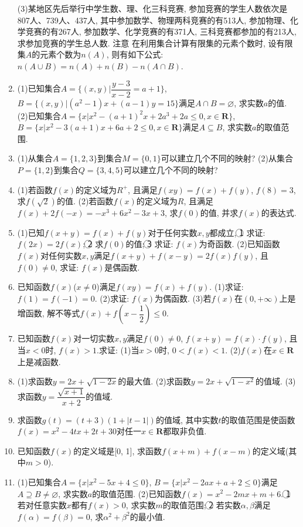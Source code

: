 \documentclass[10pt,a4paper]{article}
\begin{document}
\begin{enumerate}[1.]
(3)某地区先后举行中学生数、理、化三科竞赛, 参加竞赛的学生人数依次是807人、739人、437人, 其中参加数学、物理两科竞赛的有513人, 参加物理、化学竞赛的有267人, 参加数学、化学竞赛的有371人, 三科竞赛都参加的有213人, 求参加竞赛的学生总人数.
注意  在利用集合计算有限集的元素个数时, 设有限集$A$的元素个数为$n(A)$, 则有如下公式: $n(A\cup B)=n(A)+n(B)-n(A\cap B)$.
\item (1)已知集合$A=\{(x,y)|\dfrac{y-3}{x-2}=a+1\}$, $B=\{(x,y)|(a^2-1)x+(a-1)y=15\}$满足$A\cap B=\varnothing$, 求实数$a$的值.
(2)已知集合$A=\{x|x^2-(a+1)^2x+2a^3+2a\le 0,x\in \mathbf{R}\}$, $B=\{x|x^2-3(a+1)x+6a+2\le 0,x\in \mathbf{R}\}$满足$A\subseteq B$, 求实数$a$的取值范围.
\item (1)从集合$A=\{1,2,3\}$到集合$M=\{0,1\}$可以建立几个不同的映射?
(2)从集合$P=\{1,2\}$到集合$Q=\{3,4,5\}$可以建立几个不同的映射?
\item (1)若函数$f(x)$的定义域为$R^+$, 且满足$f(xy)=f(x)+f(y)$, $f(8)=3$, 求$f(\sqrt 2)$的值.
(2)若函数$f(x)$的定义域为$R$, 且满足$f(x)+2f(-x)=-x^3+6x^2-3x+3$, 求$f(0)$的值, 并求$f(x)$的表达式.
\item (1)已知$f(x+y)=f(x)+f(y)$对于任何实数$x,y$都成立, \textcircled{1} 求证: $f(2x)=2f(x)$; \textcircled{2} 求$f(0)$的值; \textcircled{3} 求证: $f(x)$为奇函数.
(2)已知函数$f(x)$对任何实数$x,y$满足$f(x+y)+f(x-y)=2f(x)f(y)$, 且$f(0)\ne 0$, 求证: $f(x)$是偶函数.
\item 已知函数$f(x)$($x\ne 0$)满足$f(xy)=f(x)+f(y)$.
(1)求证: $f(1)=f(-1)=0$.
(2)求证: $f(x)$为偶函数.
(3)若$f(x)$在$(0,+\infty)$上是增函数, 解不等式$f(x)+f(x-\dfrac 12)\le 0$.
\item 已知函数$f(x)$对一切实数$x,y$满足$f(0)\ne 0$, $f(x+y)=f(x)\cdot f(y)$, 且当$x<0$时, $f(x)>1$.求证:
(1)当$x>0$时, $0<f(x)<1$.
(2)$f(x)$在$x\in \mathbf{R}$上是减函数.
\item (1)求函数$y=2x+\sqrt {1-2x}$的最大值.
(2)求函数$y=2x+\sqrt {1-x^2}$的值域.
(3)求函数$y=\dfrac{\sqrt {x+1}}{x+2}$的值域.
\item 求函数$g(t)=(t+3)(1+|t-1|)$的值域, 其中实数$t$的取值范围是使函数$f(x)=x^2-4tx+2t+30$对任一$x\in \mathbf{R}$都取非负值.
\item 已知函数$f(x)$的定义域是[0, 1], 求函数$f(x+m)+f(x-m)$的定义域(其中$m>0$).
\item (1)已知集合$A=\{x|x^2-5x+4\le 0\}$, $B=\{x|x^2-2ax+a+2\le 0\}$满足$A\supseteq B\ne \varnothing$, 求实数$a$的取值范围.
(2)已知函数$f(x)=x^2-2mx+m+6$.
\textcircled{1} 若对任意实数$x$都有$f(x)>0$, 求实数$m$的取值范围;
\textcircled{2} 若实数$\alpha ,\beta$满足$f(\alpha)=f(\beta)=0$, 求$\alpha ^2+\beta ^2$的最小值.

\end{enumerate}
\end{document}
